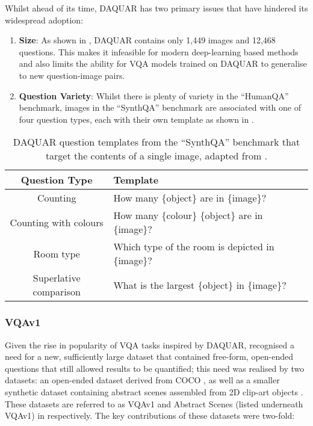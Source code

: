 Whilst ahead of its time, DAQUAR has two primary issues that have hindered its widespread adoption:
\begin{enumerate}
    \item \textbf{Size}: As shown in \tableautorefname{ \ref{tab:dataset_comparison}}, DAQUAR contains only 1,449 images and 12,468 questions. This makes it infeasible for modern deep-learning based methods and also limits the ability for VQA models trained on DAQUAR to generalise to new question-image pairs.
    \item \textbf{Question Variety}: Whilst there is plenty of variety in the ``HumanQA'' benchmark, images in the ``SynthQA'' benchmark are associated with one of four question types, each with their own template as shown in \tableautorefname{ \ref{table:daquar_templates}}.
\end{enumerate}


\begin{table}[htbp]
    \centering
    \begin{tabular}{cl}
        \toprule
        \textbf{Question Type} & \textbf{Template} \\
        \midrule
        Counting & How many \{object\} are in \{image\}?\\
        Counting with colours & How many \{colour\} \{object\} are in \{image\}?\\
        Room type & Which type of the room is depicted in \{image\}?\\
        Superlative comparison & What is the largest \{object\} in \{image\}?\\
        \bottomrule
    \end{tabular}
    \caption[DAQUAR Question templates from, adapted from \cite{malinowski2014multiworld}]{DAQUAR question templates from the ``SynthQA'' benchmark that target the contents of a single image, adapted from \cite{malinowski2014multiworld}.}
    \label{table:daquar_templates}
\end{table}

\subsubsection{VQAv1}

Given the rise in popularity of VQA tasks inspired by DAQUAR, \citeauthor{antol2015vqa} recognised a need for a new, sufficiently large dataset that contained free-form, open-ended questions that still allowed results to be quantified; this need was realised by two datasets: an open-ended dataset derived from COCO \cite{lin2014microsoft}, as well as a smaller synthetic dataset containing abstract scenes assembled from 2D clip-art objects \cite{zitnick2013bringing}. These datasets are referred to as VQAv1 and Abstract Scenes (listed underneath VQAv1) in \tableautorefname{ \ref{tab:dataset_comparison}} respectively. The key contributions of these datasets were two-fold:

